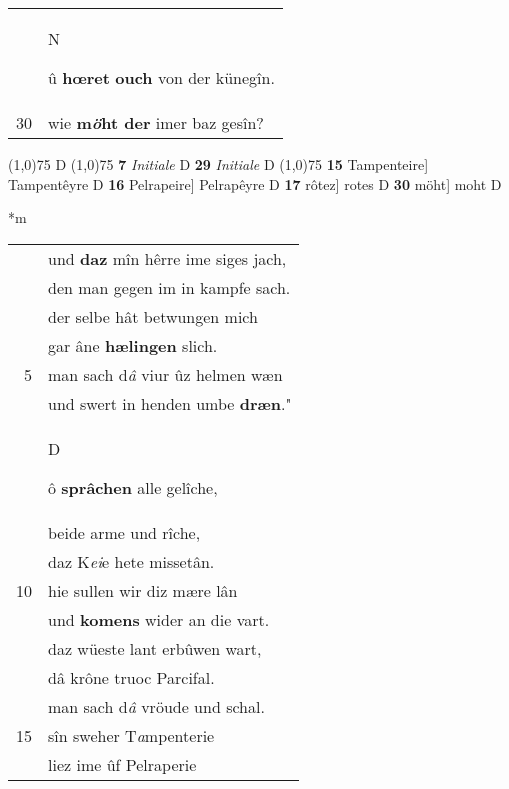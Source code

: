 \documentclass[8pt,a4paper,notitlepage]{article}
\begin{document}
\begin{table}[ht]
\begin{minipage}[t]{0.5\linewidth}
\begin{tabular}{rl}
 & \begin{large}N\end{large}û \textbf{hœret} \textbf{ouch} von der künegîn.\\ 
30 & wie \textbf{m\textit{ö}ht der} imer baz gesîn?\\ 
\end{tabular}
\scriptsize
\line(1,0){75} \newline
D \newline
\line(1,0){75} \newline
\textbf{7} \textit{Initiale} D  \textbf{29} \textit{Initiale} D  \newline
\line(1,0){75} \newline
\textbf{15} Tampenteire] Tampentêyre D \textbf{16} Pelrapeire] Pelrapêyre D \textbf{17} rôtez] rotes D \textbf{30} möht] moht D \newline
\end{minipage}
\hspace{0.5cm}
\begin{minipage}[t]{0.5\linewidth}
\small
\begin{center}*m
\end{center}
\begin{tabular}{rl}
 & und \textbf{daz} mîn hêrre ime siges jach,\\ 
 & den man gegen im in kampfe sach.\\ 
 & der selbe hât betwungen mich\\ 
 & gar âne \textbf{hælingen} slich.\\ 
5 & man sach d\textit{â} viur ûz helmen wæn\\ 
 & und swert in henden umbe \textbf{dræn}."\\ 
 & \begin{large}D\end{large}ô \textbf{sprâchen} alle gelîche,\\ 
 & beide arme und rîche,\\ 
 & daz K\textit{ei}e hete missetân.\\ 
10 & hie sullen wir diz mære lân\\ 
 & und \textbf{komens} wider an die vart.\\ 
 & daz wüeste lant erbûwen wart,\\ 
 & dâ krône truoc Parcifal.\\ 
 & man sach d\textit{â} vröude und schal.\\ 
15 & sîn sweher T\textit{a}mpenterie\\ 
 & liez ime ûf Pelraperie\\ 

\end{tabular}
\end{minipage}
\end{table}
\end{document}
